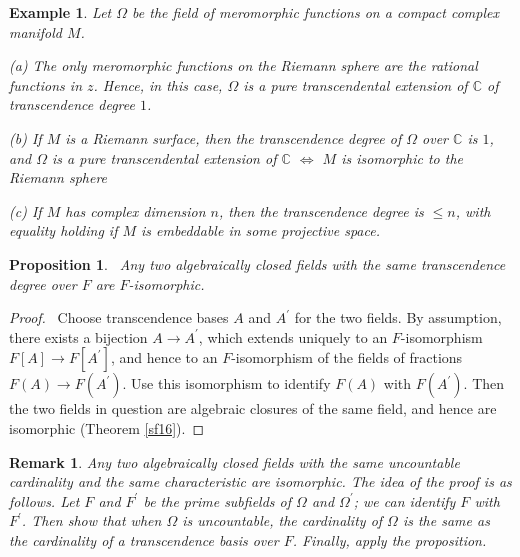 \documentclass[a4paper,11pt,final,openany]{memoir}
\newtheorem{proposition}[X]{Proposition}
\newtheorem{example}[X]{Example}
\newtheorem{remark}[X]{Remark}
\theoremstyle{nonumberplain}
\newtheorem{proof}{Proof.}
\begin{document}
\begin{example}
\label{te10}Let $\Omega$ be the field of meromorphic functions on a compact
complex manifold $M$.

(a) The only meromorphic functions on the Riemann sphere are the rational
functions in $z$. Hence, in this case, $\Omega$ is a pure transcendental
extension of $\mathbb{C}$ of transcendence degree $1$.

(b) If $M$ is a Riemann surface, then the transcendence degree of $\Omega$
over $\mathbb{C}$ is $1$, and $\Omega$ is a pure transcendental extension of
$\mathbb{C}$ $\iff$ $M$ is isomorphic to the Riemann sphere

(c) If $M$ has complex dimension $n$, then the transcendence degree is $\leq
n$, with equality holding if $M$ is embeddable in some projective space.
\end{example}

\begin{proposition}
\ \label{te14}Any two algebraically closed fields with the same transcendence
degree over $F$ are $F$-isomorphic.
\end{proposition}

\begin{proof}
\ Choose transcendence bases $A$ and $A^{\prime}$ for the two fields. By
assumption, there exists a bijection $A\rightarrow A^{\prime}$, which extends
uniquely to an $F$-isomorphism $F[A]\rightarrow F[A^{\prime}]$, and hence to
an $F$-isomorphism of the fields of fractions $F(A)\rightarrow F(A^{\prime})$.
Use this isomorphism to identify $F(A)$ with $F(A^{\prime})$. Then the two
fields in question are algebraic closures of the same field, and hence are
isomorphic (Theorem \ref{sf16}).
\end{proof}

\begin{remark}
\label{te15}Any two algebraically closed fields with the same uncountable
cardinality and the same characteristic are isomorphic. The idea of the proof
is as follows. Let $F$ and $F^{\prime}$ be the prime subfields of $\Omega$ and
$\Omega^{\prime}$; we can identify $F$ with $F^{\prime}$. Then show that when
$\Omega$ is uncountable, the cardinality of $\Omega$ is the same as the
cardinality of a transcendence basis over $F$. Finally, apply the proposition.
\end{remark}
\end{document}
